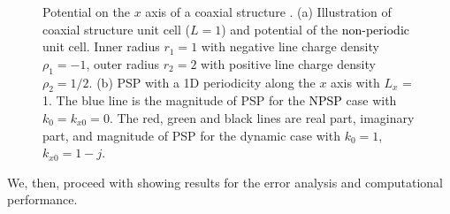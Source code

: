 \documentclass{article}
\begin{document}
\begin{figure}[htbp] \label{fig:potential}
    \centering
    \quad
    \caption{Potential on the $x$ axis of a coaxial structure . (a) Illustration of coaxial structure unit cell ($L=1$) and potential of the \textcolor{black}{non-periodic} unit cell. Inner radius $r_1=1$ with negative line charge density $\rho_1=-1$, outer radius $r_2=2$ with positive line charge density $\rho_2=1/2$. (b) PSP with a 1D periodicity along the $x$ axis with $L_x$ = 1. The blue line is the magnitude of PSP for the \textcolor{black}{NPSP} case with $k_0=k_{x0}=0$. The red, green and black lines are real part, imaginary part, and magnitude of PSP for the dynamic case with $k_0=1$, $k_{x0}=1-j$. } \label{fig:potential}
\end{figure}

We, then, proceed with showing results for the error analysis and computational performance.
\end{document}
